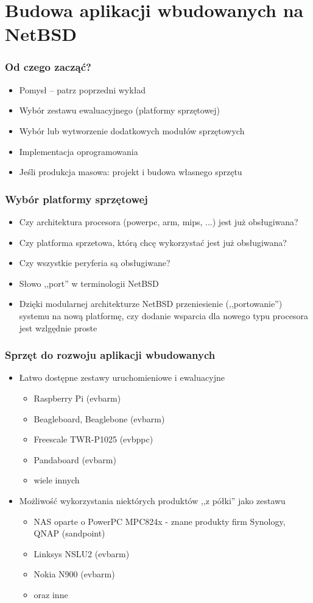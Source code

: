 \documentclass[dvipsnames,table]{beamer}
\begin{document}
\section{Budowa aplikacji wbudowanych na NetBSD}

\begin{frame}
\frametitle{Od czego zacząć?}
\begin{itemize}
	\item Pomysł -- patrz poprzedni wykład {\Large \smiley}
	\item Wybór zestawu ewaluacyjnego (platformy sprzętowej)
	\item Wybór lub wytworzenie dodatkowych modułów sprzętowych
	\item Implementacja oprogramowania
	\item Jeśli produkcja masowa: projekt i budowa własnego sprzętu
\end{itemize}
\end{frame}	

\begin{frame}
\frametitle{Wybór platformy sprzętowej}
\begin{itemize}
	\item Czy architektura procesora (powerpc, arm, mips, ...) jest już obsługiwana? 
	\item Czy platforma sprzetowa, którą chcę wykorzystać jest już obsługiwana?
	\item Czy wszystkie peryferia są obsługiwane?
	\item Słowo ,,port'' w terminologii NetBSD
	\item Dzięki modularnej architekturze NetBSD przeniesienie (,,portowanie'') systemu na nową platformę, czy dodanie wsparcia dla nowego typu procesora jest wzlgędnie proste
\end{itemize}
\end{frame}

\begin{frame}
\frametitle{Sprzęt do rozwoju aplikacji wbudowanych}
\begin{itemize}
	\item Łatwo dostępne zestawy uruchomieniowe i ewaluacyjne
	\begin{itemize}
		\item Raspberry Pi (evbarm)
		\item Beagleboard, Beaglebone (evbarm)
		\item Freescale TWR-P1025 (evbppc)
		\item Pandaboard (evbarm)
		\item wiele innych
	\end{itemize}
	\item Możliwość wykorzystania niektórych produktów ,,z półki'' jako zestawu
	\begin{itemize}
		\item NAS oparte o PowerPC MPC824x - znane produkty firm Synology, QNAP (sandpoint)
		\item Linksys NSLU2 (evbarm)
		\item Nokia N900 (evbarm)
		\item oraz inne
	\end{itemize}
\end{itemize}
\end{frame}
\end{document}
